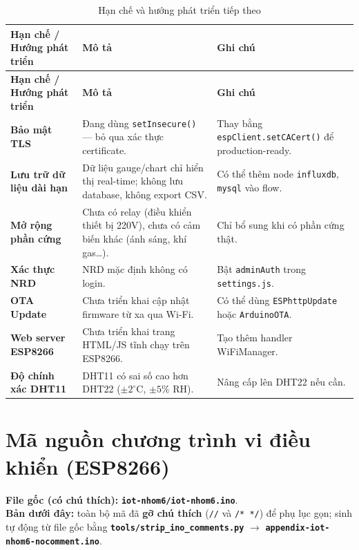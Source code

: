 \documentclass[13pt,a4paper]{article}
\newcommand{\code}[1]{\texttt{#1}}
\newcommand{\file}[1]{\textbf{\texttt{#1}}}
\begin{document}
\begin{longtable}{|L{4cm}|L{6cm}|L{3.5cm}|}
    \caption{Hạn chế và hướng phát triển tiếp theo}
    \label{tbl:limitations} \\
    \hline
    \textbf{Hạn chế / Hướng phát triển} & \textbf{Mô tả} & \textbf{Ghi chú} \\
    \hline
    \endfirsthead
    \hline
    \textbf{Hạn chế / Hướng phát triển} & \textbf{Mô tả} & \textbf{Ghi chú} \\
    \hline
    \endhead
    \hline
    \endfoot
    \textbf{Bảo mật TLS} & Đang dùng \code{setInsecure()} --- bỏ qua xác thực certificate. & Thay bằng \code{espClient.setCACert()} để production-ready. \\
    \hline
    \textbf{Lưu trữ dữ liệu dài hạn} & Dữ liệu gauge/chart chỉ hiển thị real-time; không lưu database, không export CSV. & Có thể thêm node \code{influxdb}, \code{mysql} vào flow. \\
    \hline
    \textbf{Mở rộng phần cứng} & Chưa có relay (điều khiển thiết bị 220V), chưa có cảm biến khác (ánh sáng, khí gas…). & Chỉ bổ sung khi có phần cứng thật. \\
    \hline
    \textbf{Xác thực NRD} & NRD mặc định không có login. & Bật \code{adminAuth} trong \code{settings.js}. \\
    \hline
    \textbf{OTA Update} & Chưa triển khai cập nhật firmware từ xa qua Wi-Fi. & Có thể dùng \code{ESPhttpUpdate} hoặc \code{ArduinoOTA}. \\
    \hline
    \textbf{Web server ESP8266} & Chưa triển khai trang HTML/JS tĩnh chạy trên ESP8266. & Tạo thêm handler WiFiManager. \\
    \hline
    \textbf{Độ chính xác DHT11} & DHT11 có sai số cao hơn DHT22 ($\pm2^\circ$C, $\pm5\%$ RH). & Nâng cấp lên DHT22 nếu cần. \\
    \hline
\end{longtable}

\appendix
\section{Mã nguồn chương trình vi điều khiển (ESP8266)}
\label{sec:code}

\textbf{File gốc (có chú thích):} \file{iot-nhom6/iot-nhom6.ino}.\\
\textbf{Bản dưới đây:} toàn bộ mã đã \textbf{gỡ chú thích} (\texttt{//} và \texttt{/* */}) để phụ lục gọn; sinh tự động từ file gốc bằng \file{tools/strip\_ino\_comments.py} $\rightarrow$ \file{appendix-iot-nhom6-nocomment.ino}.
\end{document}
